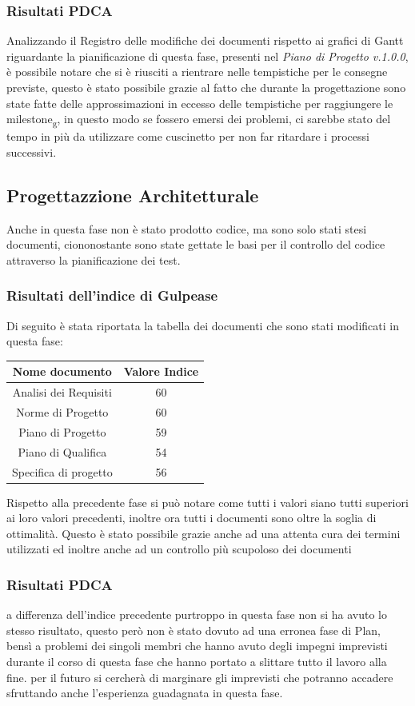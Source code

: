 \documentclass[12pt,a4paper,titlepage]{article}
\begin{document}
    \subsubsection{Risultati PDCA}
    Analizzando il Registro delle modifiche dei documenti rispetto ai grafici di Gantt riguardante la pianificazione di questa fase, presenti nel \textit{Piano di Progetto v.1.0.0}, è possibile notare che si è riusciti a rientrare nelle tempistiche per le consegne previste, questo è stato possibile grazie al fatto che durante la progettazione sono state fatte delle approssimazioni in eccesso delle tempistiche per raggiungere le milestone\textsubscript{g},
    in questo modo se fossero emersi dei problemi, ci sarebbe stato del tempo in più da utilizzare come cuscinetto per non far ritardare i processi successivi.
    
    \subsection{Progettazzione Architetturale}
    
    Anche in questa fase non è stato prodotto codice, ma sono solo stati stesi documenti, ciononostante sono state gettate le basi per il controllo del codice attraverso la pianificazione dei test.\\
    
    \subsubsection{Risultati dell'indice di Gulpease}
     Di seguito è stata riportata la tabella dei documenti che sono stati modificati in questa fase:
    \begin{tabular}{|c|c|}
    	{\textbf{Nome documento}}&{\textbf{Valore Indice}}\\
    	\hline
    	Analisi dei Requisiti & 60\\
    	\hline
    	Norme di Progetto & 60\\
    	\hline
    	Piano di Progetto & 59\\
    	\hline
    	Piano di Qualifica & 54\\
    	\hline
    	Specifica di progetto & 56\\
    \end{tabular}
    Rispetto alla precedente fase si può notare come tutti i valori siano tutti superiori ai loro valori precedenti, inoltre ora tutti i documenti sono oltre la soglia di ottimalità. 
    Questo è stato possibile grazie anche ad una attenta cura dei termini utilizzati ed inoltre anche ad un controllo più scupoloso dei documenti
    
    \subsubsection{Risultati PDCA}
    a differenza dell'indice precedente purtroppo in questa fase non si ha avuto lo stesso risultato, questo però non è stato dovuto ad una erronea fase di Plan, bensì a problemi dei singoli membri che hanno avuto degli impegni imprevisti durante il corso di questa fase
    che hanno portato a slittare tutto il lavoro alla fine. per il futuro si cercherà di marginare gli imprevisti che potranno accadere sfruttando anche l'esperienza guadagnata in questa fase.
    
\end{document}
